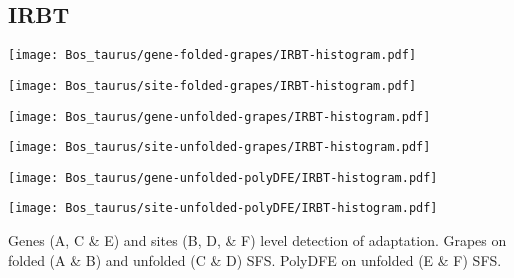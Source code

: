\documentclass{article}
\begin{document}
\subsection{IRBT}
\centering
\begin{minipage}{0.49\linewidth}
    \texttt{[image: Bos\_taurus/gene-folded-grapes/IRBT-histogram.pdf]}
\end{minipage}%
\hfill
\begin{minipage}{0.49\linewidth}
    \texttt{[image: Bos\_taurus/site-folded-grapes/IRBT-histogram.pdf]}
\end{minipage}
\hfill
\begin{minipage}{0.49\linewidth}
    \texttt{[image: Bos\_taurus/gene-unfolded-grapes/IRBT-histogram.pdf]}
\end{minipage}%
\hfill
\begin{minipage}{0.49\linewidth}
    \texttt{[image: Bos\_taurus/site-unfolded-grapes/IRBT-histogram.pdf]}
\end{minipage}
\hfill
\begin{minipage}{0.49\linewidth}
    \texttt{[image: Bos\_taurus/gene-unfolded-polyDFE/IRBT-histogram.pdf]}
\end{minipage}%
\hfill
\begin{minipage}{0.49\linewidth}
    \texttt{[image: Bos\_taurus/site-unfolded-polyDFE/IRBT-histogram.pdf]}
\end{minipage}
\hfill
\flushleft
Genes (A, C \& E) and sites (B, D, \& F) level detection of adaptation.
Grapes on folded (A \& B) and unfolded (C \& D) SFS.
PolyDFE on unfolded (E \& F) SFS.

\pagebreak
\end{document}
